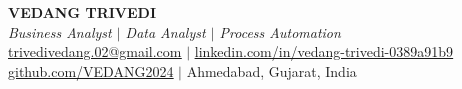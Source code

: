 \documentclass[letterpaper,10pt]{article}
\begin{document}
\newcommand{\resumeItem}[1]{
  \item\footnotesize{
    {#1}
  }
}

\newcommand{\resumeSubheading}[4]{
  \vspace{5pt}\item
    \textbf{\small #1} \hfill \footnotesize #2 \\
    \textit{\scriptsize#3} \hfill \textit{\scriptsize #4} \\
  \vspace{-3pt}
}

\newcommand{\listOfSkills}[2]{
    \vspace{0.03em}
    \hangindent=0.5em
    \hangafter=1
    \hspace{0.5em}
    \footnotesize
    \textbf{#1}: {#2}
    \\
}

\newcommand{\resumeSubSubheading}[2]{
    \item
    \textit{\footnotesize#1} \hfill \textit{\footnotesize #2} \\
    \vspace{-8pt}
}

\newcommand{\resumeProjectHeading}[2]{
    \vspace{5pt}
    \item
    \footnotesize#1 \hfill \footnotesize#2 \\
    \vspace{-3pt}
}

\newcommand{\resumeSubItem}[1]{\resumeItem{#1}\vspace{-3pt}}

\renewcommand\labelitemii{$\vcenter{\hbox{\tiny$\bullet$}}$}

\newcommand{\resumeSubHeadingListStart}{\begin{itemize}[leftmargin=0.1in, label={}]}
\newcommand{\resumeSubHeadingListEnd}{\end{itemize}}
\newcommand{\resumeItemListStart}{\vspace{3pt}\begin{itemize}}
\newcommand{\resumeItemListEnd}{\end{itemize}\vspace{-5pt}}


\begin{center}
    \textbf{\large VEDANG TRIVEDI} \\[0.15em]
    \textit{\footnotesize Business Analyst $\vert$ Data Analyst $\vert$ Process Automation} \\[0.15em]
    \href{mailto:trivedivedang.02@gmail.com}{\underline{\footnotesize trivedivedang.02@gmail.com}} \quad $|$ \quad
    \href{https://www.linkedin.com/in/vedang-trivedi-0389a91b9}{\underline{\footnotesize linkedin.com/in/vedang-trivedi-0389a91b9}} \\[0.15em]
    \href{https://www.github.com/VEDANG2024}{\underline{\footnotesize github.com/VEDANG2024}} \quad $|$ \quad
    \footnotesize Ahmedabad, Gujarat, India
\end{center}
\vspace{-0.3em}
\end{document}
